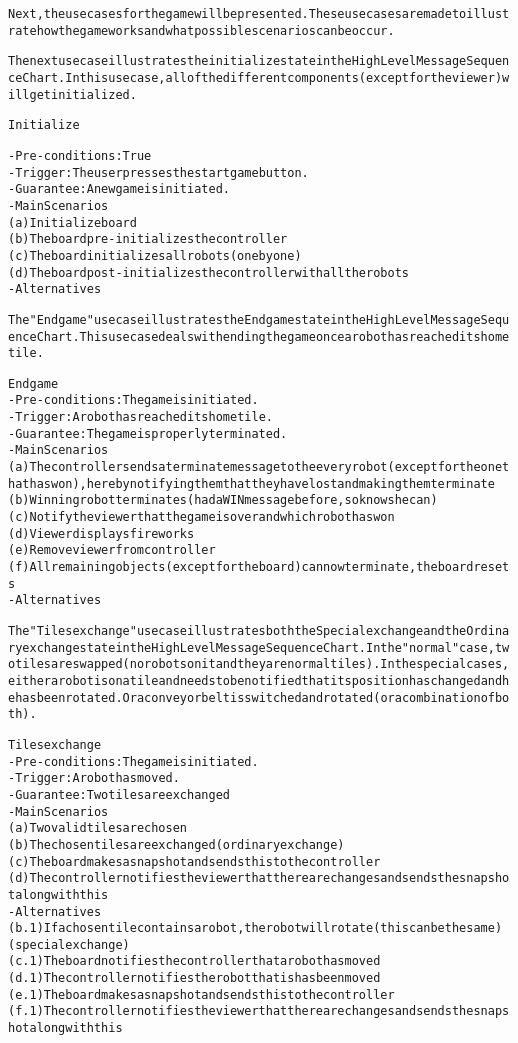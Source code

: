 \begin{alltt}
\rm
Next, the use cases for the game will be presented. These use cases are made to illustrate how the game works and what possible scenarios can be occur.

The next use case illustrates the initialize state in the High Level Message Sequence Chart. In this use case, all of the different components (except for the viewer) will get initialized.

Initialize

- Pre-conditions: True
- Trigger: The user presses the start game button.
- Guarantee: A new game is initiated.
- Main Scenarios
    (a) Initialize board
    (b) The board pre-initializes the controller
    (c) The board initializes all robots (one by one)
    (d) The board post-initializes the controller with all the robots
- Alternatives

The "End game" use case illustrates the End game state in the High Level Message Sequence Chart. This use case deals with ending the game once a robot has reached its home tile.

End game
- Pre-conditions: The game is initiated.
- Trigger:  A robot has reached its home tile.
- Guarantee: The game is properly terminated.
- Main Scenarios
    (a) The controller sends a terminate message to the every robot (except for the one that has won), hereby notifying them that they have lost and making them terminate
    (b) Winning robot terminates (had a WIN message before, so knows he can)
    (c) Notify the viewer that the game is over and which robot has won
    (d) Viewer displays fireworks
    (e) Remove viewer from controller
    (f) All remaining objects (except for the board) can now terminate, the board resets
- Alternatives

The "Tiles exchange" use case illustrates both the Special exchange and the Ordinary exchange state in the High Level Message Sequence Chart. In the "normal" case, two tiles are swapped (no robots on it and they are normal tiles). In the special cases, either a robot is on a tile and needs to be notified that its position has changed and he has been rotated. Or a conveyor belt is switched and rotated (or a combination of both).

Tiles exchange
- Pre-conditions: The game is initiated.
- Trigger:  A robot has moved.
- Guarantee: Two tiles are exchanged
- Main Scenarios
    (a) Two valid tiles are chosen
    (b) The chosen tiles are exchanged (ordinary exchange)
    (c) The board makes a snapshot and sends this to the controller
    (d) The controller notifies the viewer that there are changes and sends the snapshot along with this
- Alternatives
    (b.1) If a chosen tile contains a robot, the robot will rotate (this can be the same) (special exchange)
    (c.1) The board notifies the controller that a robot has moved
    (d.1) The controller notifies the robot that is has been moved
    (e.1) The board makes a snapshot and sends this to the controller
    (f.1) The controller notifies the viewer that there are changes and sends the snapshot along with this
    

\end{alltt}
